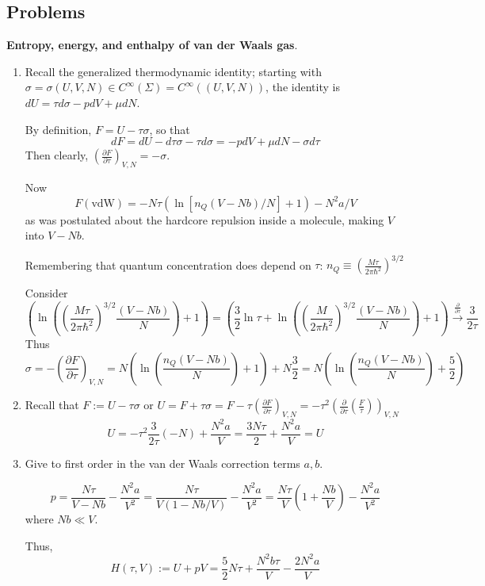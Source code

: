\subsection*{Problems}

 \textbf{Entropy, energy, and enthalpy of van der Waals gas}.  
\begin{enumerate}
\item[(a)]
Recall the generalized thermodynamic identity; starting with $\sigma = \sigma(U,V,N) \in C^{\infty}(\Sigma) = C^{\infty}((U,V,N))$, the identity is $dU = \tau d\sigma - pdV + \mu dN$.  

By definition, $F=U-\tau \sigma$, so that 
\[
dF = dU- d\tau \sigma -\tau d\sigma = - pdV + \mu dN - \sigma d\tau 
\]
Then clearly, $\left( \frac{ \partial F}{ \partial \tau} \right)_{V,N} = -\sigma$.  



Now 
\[
F(\text{vdW}) = -N\tau ( \ln{ [n_Q (V-Nb)/N ]} + 1) - N^2 a /V
\]
as was postulated about the hardcore repulsion inside a molecule, making $V$ into $V-Nb$.  

Remembering that quantum concentration does depend on $\tau$: $n_Q \equiv \left( \frac{ M \tau}{ 2\pi \hbar^2 } \right)^{3/2}$


Consider 
\[
\left( \ln{ ( \left( \frac{M \tau}{ 2\pi \hbar^2} \right)^{3/2} \frac{ (V-Nb)}{ N} )} + 1 \right) = \left( \frac{3}{2} \ln{\tau} + \ln{ \left( \left( \frac{M}{2\pi \hbar^2} \right)^{3/2} \frac{(V-Nb)}{N} \right) } + 1 \right) \xrightarrow{ \frac{ \partial }{\partial \tau} } \frac{3}{2\tau}
\]
Thus
\[
\sigma = - \left( \frac{ \partial F}{ \partial \tau } \right)_{V,N} = N \left( \ln{ \left( \frac{n_Q(V-Nb)}{N} \right) } +1 \right) + N \frac{3}{2} = N \left( \ln{ \left( \frac{n_Q(V-Nb)}{N} \right) } + \frac{5}{2} \right)
\]

\item[(b)] Recall that $F:= U-\tau \sigma$ or $U = F+\tau \sigma = F- \tau \left( \frac{ \partial F}{ \partial \tau} \right)_{V,N} = -\tau^2 \left( \frac{ \partial }{ \partial \tau} \left( \frac{F}{\tau} \right) \right)_{V,N}$  
\[
 U = -\tau^2 \frac{3}{2\tau}(-N) + \frac{N^2a }{V} = \boxed{ \frac{3N\tau}{2} + \frac{N^2a }{V} = U }
\]
\item[(c)] Give to first order in the van der Waals correction terms $a,b$.  

\[
p = \frac{N\tau}{V-Nb} - \frac{N^2a}{V^2} = \frac{N\tau}{ V(1- Nb/V)} - \frac{N^2 a}{V^2} = \frac{N\tau}{V} ( 1 + \frac{Nb}{V} ) - \frac{N^2 a}{V^2}
\]
where $Nb \ll V$.  

Thus,
\[
\boxed{ H(\tau,V) := U + pV = \frac{5}{2} N\tau  + \frac{N^2 b\tau}{V} - \frac{2N^2 a}{V} }
\]
\end{enumerate}


